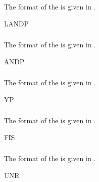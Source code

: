 \subsubsection{}\label{sec:LANDPBlock}
The format of the  is given in .
\begin{BlockTable}{LANDP}
  \label{tab:LANDPBlock}
\end{BlockTable}

\subsubsection{}\label{sec:ANDPBlock}
The format of the  is given in .
\begin{BlockTable}{ANDP}
  \label{tab:ANDPBlock}
\end{BlockTable}

\subsubsection{}\label{sec:YPBlock}
The format of the  is given in .
\begin{BlockTable}{YP}
  \label{tab:YPBlock}
\end{BlockTable}

\subsubsection{}\label{sec:FISBlock}
The format of the  is given in .
\begin{BlockTable}{FIS}
  \label{tab:FISBlock}
\end{BlockTable}

\subsubsection{}\label{sec:UNRBlock}
The format of the  is given in .
\begin{BlockTable}{UNR}
  \label{tab:UNRBlock}
\end{BlockTable}

